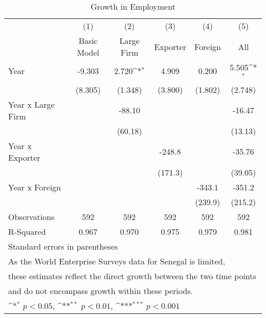 \begin{table}[htbp]\centering
\def\sym#1{\ifmmode^{#1}\else\(^{#1}\)\fi}
\caption{Growth in Employment}
\begin{tabular}{l*{5}{c}}
\hline\hline
            &\multicolumn{1}{c}{(1)}&\multicolumn{1}{c}{(2)}&\multicolumn{1}{c}{(3)}&\multicolumn{1}{c}{(4)}&\multicolumn{1}{c}{(5)}\\
            &\multicolumn{1}{c}{Basic Model}&\multicolumn{1}{c}{Large Firm}&\multicolumn{1}{c}{Exporter}&\multicolumn{1}{c}{Foreign}&\multicolumn{1}{c}{All}\\
\hline
Year        &      -9.303         &       2.720\sym{*}  &       4.909         &       0.200         &       5.505\sym{*}  \\
            &     (8.305)         &     (1.348)         &     (3.800)         &     (1.802)         &     (2.748)         \\
[1em]
Year x Large Firm&                     &      -88.10         &                     &                     &      -16.47         \\
            &                     &     (60.18)         &                     &                     &     (13.13)         \\
[1em]
Year x Exporter&                     &                     &      -248.8         &                     &      -35.76         \\
            &                     &                     &     (171.3)         &                     &     (39.05)         \\
[1em]
Year x Foreign&                     &                     &                     &      -343.1         &      -351.2         \\
            &                     &                     &                     &     (239.9)         &     (215.2)         \\
\hline
Observations&         592         &         592         &         592         &         592         &         592         \\
R-Squared   &       0.967         &       0.970         &       0.975         &       0.979         &       0.981         \\
\hline\hline
\multicolumn{6}{l}{\footnotesize Standard errors in parentheses}\\
\multicolumn{6}{l}{\footnotesize As the World Enterprise Surveys data for Senegal is limited,}\\
\multicolumn{6}{l}{\footnotesize these estimates reflect the direct growth between the two time points}\\
\multicolumn{6}{l}{\footnotesize and do not encompass growth within these periods.}\\
\multicolumn{6}{l}{\footnotesize \sym{*} \(p<0.05\), \sym{**} \(p<0.01\), \sym{***} \(p<0.001\)}\\
\end{tabular}
\end{table}
